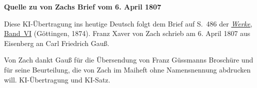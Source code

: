 \clearpage\thispagestyle{empty}
\begin{center}\textbf{Quelle zu von Zachs Brief vom 6. April 1807}\end{center}
\noindent Diese KI-Übertragung ins heutige Deutsch folgt dem Brief auf S.~486 der \href{https://gdz.sub.uni-goettingen.de/id/PPN236007467}{\textit{Werke}, Band~VI} (Göttingen, 1874). Franz Xaver von Zach schrieb am 6. April 1807 aus Eisenberg an Carl Friedrich Gauß.
\par\smallskip\noindent Von Zach dankt Gauß für die Übersendung von Franz Güssmanns Broschüre und für seine Beurteilung, die von Zach im Maiheft ohne Namensnennung abdrucken will. KI-Übertragung und KI-Satz.
\clearpage
